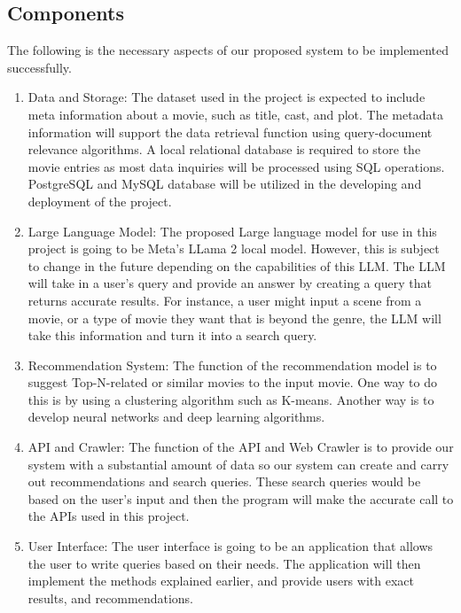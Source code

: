 \documentclass[journal]{IEEEtran}
\begin{document}
\subsection{Components}
The following is the necessary aspects of our proposed system to be implemented successfully.
\begin{enumerate}
    \item {Data and Storage}: The dataset used in the project is expected to include meta information about a movie, such as title, cast, and plot. The metadata information will support the data retrieval function using query-document relevance algorithms. A local relational database is required to store the movie entries as most data inquiries will be processed using SQL operations. PostgreSQL and MySQL database will be utilized in the developing and deployment of the project. 

    \item {Large Language Model}: The proposed Large language model for use in this project is going to be Meta’s LLama 2 local model. However, this is subject to change in the future depending on the capabilities of this LLM. The LLM will take in a user’s query and provide an answer by creating a query that returns accurate results. For instance, a user might input a scene from a movie, or a type of movie they want that is beyond the genre, the LLM will take this information and turn it into a search query.

    \item {Recommendation System}: The function of the recommendation model is to suggest Top-N-related or similar movies to the input movie. One way to do this is by using a clustering algorithm such as K-means. Another way is to develop neural networks and deep learning algorithms.

    \item {API and Crawler}: The function of the API and Web Crawler is to provide our system with a substantial amount of data so our system can create and carry out recommendations and search queries. These search queries would be based on the user’s input and then the program will make the accurate call to the APIs used in this project.

    \item {User Interface}: The user interface is going to be an application that allows the user to write queries based on their needs. The application will then implement the methods explained earlier, and provide users with exact results, and recommendations.
    

\end{enumerate}
\end{document}
